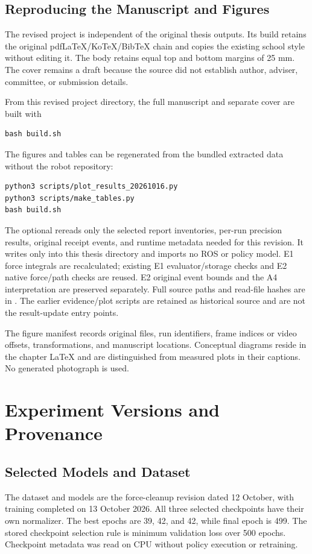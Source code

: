 \section{Reproducing the Manuscript and Figures}
The revised project is independent of the original thesis outputs. Its build retains the original pdfLaTeX/KoTeX/BibTeX chain and copies the existing school style without editing it. The body retains equal top and bottom margins of 25 mm. The cover remains a draft because the source did not establish author, adviser, committee, or submission details.

From this revised project directory, the full manuscript and separate cover are built with
\begin{verbatim}
bash build.sh
\end{verbatim}
The figures and tables can be regenerated from the bundled extracted data without the robot repository:
\begin{verbatim}
python3 scripts/plot_results_20261016.py
python3 scripts/make_tables.py
bash build.sh
\end{verbatim}
The optional  rereads only the selected report inventories, per-run precision results, original receipt events, and runtime metadata needed for this revision. It writes only into this thesis directory and imports no ROS or policy model. E1 force integrals are recalculated; existing E1 evaluator/storage checks and E2 native force/path checks are reused. E2 original event bounds and the A4 interpretation are preserved separately. Full source paths and read-file hashes are in . The earlier evidence/plot scripts are retained as historical source and are not the result-update entry points.

The figure manifest records original files, run identifiers, frame indices or video offsets, transformations, and manuscript locations. Conceptual diagrams reside in the chapter LaTeX and are distinguished from measured plots in their captions. No generated photograph is used.

\chapter{Experiment Versions and Provenance}
\label{app:provenance}

\section{Selected Models and Dataset}
The dataset and models are the force-cleanup revision dated 12 October, with training completed on 13 October 2026. All three selected checkpoints have their own normalizer. The best epochs are 39, 42, and 42, while final epoch is 499. The stored checkpoint selection rule is minimum validation loss over 500 epochs. Checkpoint metadata was read on CPU without policy execution or retraining.

